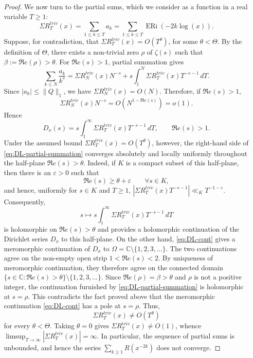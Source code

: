 \documentclass[a4paper,10pt]{amsart}
\DeclareMathOperator{\ERi}{ERi}
\theoremstyle{definition}
\numberwithin{equation}{section}
\begin{document}
\begin{proof}
We now turn to the partial sums, which we consider as a function in a real variable $T\geq1$:
$$
\Sigma R^{triv}_T(x)=\sum_{1\leq k\leq T}a_k = \sum_{1\leq k\leq T}\ERi(-2k\log(x)).
$$
Suppose, for contradiction, that $\Sigma R^{triv}_T(x)=O(T^\theta)$, for some $\theta<\Theta$. By the definition of $\Theta$, there exists a non-trivial zero $\rho$ of $\zeta(s)$ such that $\beta:=\Re e(\rho)>\theta$. For $\Re e(s)>1$, partial summation gives
$$
\sum_{k\leq N}\frac{a_k}{k^s} = \Sigma R^{triv}_N(x)N^{-s} + s\int_1^N \Sigma R^{triv}_T(x)T^{-s-1}\,dT.
$$
Since $|a_k|\leq\|Q\|_1$, we have $\Sigma R^{triv}_N(x)=O(N)$. Therefore, if $\Re e(s)>1$,
$$
\Sigma R^{triv}_N(x)N^{-s}=O(N^{1-\Re e(s)})=o(1).
$$ Hence 
\begin{equation}\label{eq:DL-partial-summation}
D_x(s)=s\int_1^\infty \Sigma R^{triv}_T(x)T^{-s-1}\,dT, \qquad \Re e(s)>1.
\end{equation}
Under the assumed bound $\Sigma R^{triv}_T(x)=O(T^\theta)$, however, the right-hand side of \eqref{eq:DL-partial-summation} converges absolutely and locally uniformly throughout the half-plane $\Re e(s)>\theta$. Indeed, if $K$ is a compact subset of this half-plane, then there is an $\varepsilon>0$ such that
$$
\Re e(s)\geq\theta+\varepsilon
\qquad \forall s\in K,
$$
and hence, uniformly for $s\in K$ and $T\geq1$, $\left|\Sigma R^{triv}_T(x)T^{-s-1}\right| \ll_K T^{-1-\varepsilon}$. Consequently,
$$
s\longmapsto s\int_1^\infty \Sigma R^{triv}_T(x)T^{-s-1}\,dT
$$
is holomorphic on $\Re e(s)>\theta$ and provides a holomorphic continuation of the Dirichlet series $D_x$ to this half-plane. On the other hand, \eqref{eq:DL-cont} gives a meromorphic continuation of $D_x$ to $\Omega=\mathbb C\setminus\{1,2,3,\ldots\}$. The two continuations agree on the non-empty open strip $1<\Re e(s)<2$. By uniqueness of meromorphic continuation, they therefore agree on the connected domain $\{s\in\mathbb C:\Re e(s)>\theta\}\setminus\{1,2,3,\ldots\}$. Since $\Re e(\rho)=\beta>\theta$ and $\rho$ is not a positive integer, the continuation furnished by \eqref{eq:DL-partial-summation} is holomorphic at $s=\rho$. This contradicts the fact proved above that the meromorphic continuation \eqref{eq:DL-cont} has a pole at $s=\rho$. Thus,
$$
\Sigma R^{triv}_T(x)\neq O(T^\theta)
$$
for every $\theta<\Theta$. Taking $\theta=0$ gives $\Sigma R^{triv}_T(x)\neq O(1)$, whence $\limsup_{T\to\infty}|\Sigma R^{triv}_T(x)|=\infty$. In particular, the sequence of partial sums is unbounded, and hence the series $\sum_{k\geq1}R(x^{-2k})$ does not converge.
\end{proof}
\end{document}
